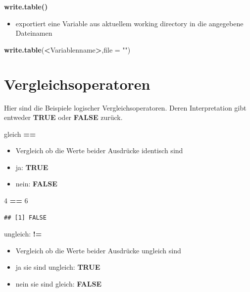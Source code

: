 \documentclass[]{book}
\newenvironment{Shaded}{\begin{snugshade}}{\end{snugshade}}
\newcommand{\KeywordTok}[1]{\textcolor[rgb]{0.13,0.29,0.53}{\textbf{#1}}}
\newcommand{\DataTypeTok}[1]{\textcolor[rgb]{0.13,0.29,0.53}{#1}}
\newcommand{\DecValTok}[1]{\textcolor[rgb]{0.00,0.00,0.81}{#1}}
\newcommand{\StringTok}[1]{\textcolor[rgb]{0.31,0.60,0.02}{#1}}
\newcommand{\OperatorTok}[1]{\textcolor[rgb]{0.81,0.36,0.00}{\textbf{#1}}}
\newcommand{\NormalTok}[1]{#1}
\providecommand{\tightlist}{%
  \setlength{\itemsep}{0pt}\setlength{\parskip}{0pt}}
\begin{document}
\textbf{write.table()}

\begin{itemize}
\tightlist
\item
  exportiert eine Variable aus aktuellem working directory in die
  angegebene Dateinamen
\end{itemize}

\begin{Shaded}
\begin{Highlighting}[]
\KeywordTok{write.table}\NormalTok{(}\OperatorTok{<}\NormalTok{Variablenname}\OperatorTok{>}\NormalTok{,}\DataTypeTok{file =} \StringTok{""}\NormalTok{)}
\end{Highlighting}
\end{Shaded}

\section{Vergleichsoperatoren}\label{vergleichsoperatoren}

Hier sind die Beispiele logischer Vergleichsoperatoren. Deren
Interpretation gibt entweder \textbf{TRUE} oder \textbf{FALSE} zurück.

gleich \textbf{==}

\begin{itemize}
\tightlist
\item
  Vergleich ob die Werte beider Ausdrücke identisch sind
\item
  ja: \textbf{TRUE}
\item
  nein: \textbf{FALSE}
\end{itemize}

\begin{Shaded}
\begin{Highlighting}[]
\DecValTok{4} \OperatorTok{==}\StringTok{ }\DecValTok{6}
\end{Highlighting}
\end{Shaded}

\begin{verbatim}
## [1] FALSE
\end{verbatim}

ungleich: \textbf{!=}

\begin{itemize}
\tightlist
\item
  Vergleich ob die Werte beider Ausdrücke ungleich sind
\item
  ja sie sind ungleich: \textbf{TRUE}
\item
  nein sie sind gleich: \textbf{FALSE}
\end{itemize}
\end{document}
